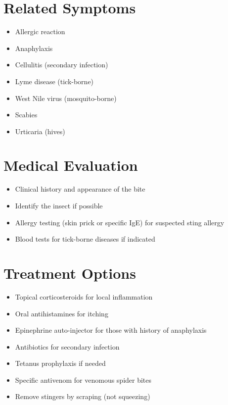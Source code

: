 \section*{Related Symptoms}
\begin{itemize}
\item Allergic reaction
\item Anaphylaxis
\item Cellulitis (secondary infection)
\item Lyme disease (tick-borne)
\item West Nile virus (mosquito-borne)
\item Scabies
\item Urticaria (hives)
\end{itemize}

\section*{Medical Evaluation}
\begin{itemize}
\item Clinical history and appearance of the bite
\item Identify the insect if possible
\item Allergy testing (skin prick or specific IgE) for suspected sting allergy
\item Blood tests for tick-borne diseases if indicated
\end{itemize}

\section*{Treatment Options}
\begin{itemize}
\item Topical corticosteroids for local inflammation
\item Oral antihistamines for itching
\item Epinephrine auto-injector for those with history of anaphylaxis
\item Antibiotics for secondary infection
\item Tetanus prophylaxis if needed
\item Specific antivenom for venomous spider bites
\item Remove stingers by scraping (not squeezing)
\end{itemize}


